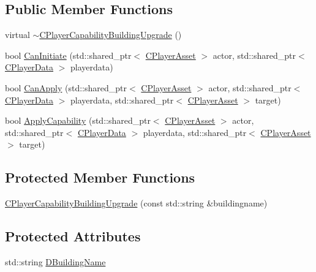 \subsection*{Public Member Functions}
\begin{DoxyCompactItemize}
\item 
virtual \hyperlink{classCPlayerCapabilityBuildingUpgrade_abcef586e377c86c3da3cd698dca268ef}{$\sim$\+C\+Player\+Capability\+Building\+Upgrade} ()
\item 
bool \hyperlink{classCPlayerCapabilityBuildingUpgrade_af515cec6f1a28607864c853307e17d7c}{Can\+Initiate} (std\+::shared\+\_\+ptr$<$ \hyperlink{classCPlayerAsset}{C\+Player\+Asset} $>$ actor, std\+::shared\+\_\+ptr$<$ \hyperlink{classCPlayerData}{C\+Player\+Data} $>$ playerdata)
\item 
bool \hyperlink{classCPlayerCapabilityBuildingUpgrade_a22de7902bcf6406a3b3a7c51e5c56f35}{Can\+Apply} (std\+::shared\+\_\+ptr$<$ \hyperlink{classCPlayerAsset}{C\+Player\+Asset} $>$ actor, std\+::shared\+\_\+ptr$<$ \hyperlink{classCPlayerData}{C\+Player\+Data} $>$ playerdata, std\+::shared\+\_\+ptr$<$ \hyperlink{classCPlayerAsset}{C\+Player\+Asset} $>$ target)
\item 
bool \hyperlink{classCPlayerCapabilityBuildingUpgrade_a5e71446b74307f31ce6d6e9bbfd9a681}{Apply\+Capability} (std\+::shared\+\_\+ptr$<$ \hyperlink{classCPlayerAsset}{C\+Player\+Asset} $>$ actor, std\+::shared\+\_\+ptr$<$ \hyperlink{classCPlayerData}{C\+Player\+Data} $>$ playerdata, std\+::shared\+\_\+ptr$<$ \hyperlink{classCPlayerAsset}{C\+Player\+Asset} $>$ target)
\end{DoxyCompactItemize}
\subsection*{Protected Member Functions}
\begin{DoxyCompactItemize}
\item 
\hyperlink{classCPlayerCapabilityBuildingUpgrade_a80ccec4b17a9e43914bec537dcbe1b9e}{C\+Player\+Capability\+Building\+Upgrade} (const std\+::string \&buildingname)
\end{DoxyCompactItemize}
\subsection*{Protected Attributes}
\begin{DoxyCompactItemize}
\item 
std\+::string \hyperlink{classCPlayerCapabilityBuildingUpgrade_a244e767a3e669441cfb03c13bf703e64}{D\+Building\+Name}
\end{DoxyCompactItemize}

